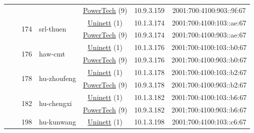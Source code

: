 \begin{small}
\begin{center}
\begin{longtable}{|c|c|c|c|c|c|c|c|}
  &  &  &  & \multicolumn{2}{|c|}{\tiny{\href{http://www.powertech.no}{PowerTech} (9)}} & \tiny{10.9.3.159} & \tiny{2001:700:4100:903::9f:67} \\* \cline{3-3}\cline{4-4}\cline{5-5}\cline{6-6}\cline{7-7}\cline{8-8}
  &  & \multirow{2}{*}{\tiny{174}} & \multicolumn{1}{|l|}{\multirow{2}{*}{\tiny{srl-thuen}}} & \multicolumn{2}{|c|}{\tiny{\href{https://www.uninett.no}{Uninett} (1)}} & \tiny{10.1.3.174} & \tiny{2001:700:4100:103::ae:67} \\* \cline{5-5}\cline{6-6}\cline{7-7}\cline{8-8}
  &  &  &  & \multicolumn{2}{|c|}{\tiny{\href{http://www.powertech.no}{PowerTech} (9)}} & \tiny{10.9.3.174} & \tiny{2001:700:4100:903::ae:67} \\* \cline{3-3}\cline{4-4}\cline{5-5}\cline{6-6}\cline{7-7}\cline{8-8}
  &  & \multirow{2}{*}{\tiny{176}} & \multicolumn{1}{|l|}{\multirow{2}{*}{\tiny{haw-cmt}}} & \multicolumn{2}{|c|}{\tiny{\href{https://www.uninett.no}{Uninett} (1)}} & \tiny{10.1.3.176} & \tiny{2001:700:4100:103::b0:67} \\* \cline{5-5}\cline{6-6}\cline{7-7}\cline{8-8}
  &  &  &  & \multicolumn{2}{|c|}{\tiny{\href{http://www.powertech.no}{PowerTech} (9)}} & \tiny{10.9.3.176} & \tiny{2001:700:4100:903::b0:67} \\* \cline{3-3}\cline{4-4}\cline{5-5}\cline{6-6}\cline{7-7}\cline{8-8}
  &  & \multirow{2}{*}{\tiny{178}} & \multicolumn{1}{|l|}{\multirow{2}{*}{\tiny{hu-zhoufeng}}} & \multicolumn{2}{|c|}{\tiny{\href{https://www.uninett.no}{Uninett} (1)}} & \tiny{10.1.3.178} & \tiny{2001:700:4100:103::b2:67} \\* \cline{5-5}\cline{6-6}\cline{7-7}\cline{8-8}
  &  &  &  & \multicolumn{2}{|c|}{\tiny{\href{http://www.powertech.no}{PowerTech} (9)}} & \tiny{10.9.3.178} & \tiny{2001:700:4100:903::b2:67} \\* \cline{3-3}\cline{4-4}\cline{5-5}\cline{6-6}\cline{7-7}\cline{8-8}
  &  & \multirow{2}{*}{\tiny{182}} & \multicolumn{1}{|l|}{\multirow{2}{*}{\tiny{hu-chengxi}}} & \multicolumn{2}{|c|}{\tiny{\href{https://www.uninett.no}{Uninett} (1)}} & \tiny{10.1.3.182} & \tiny{2001:700:4100:103::b6:67} \\* \cline{5-5}\cline{6-6}\cline{7-7}\cline{8-8}
  &  &  &  & \multicolumn{2}{|c|}{\tiny{\href{http://www.powertech.no}{PowerTech} (9)}} & \tiny{10.9.3.182} & \tiny{2001:700:4100:903::b6:67} \\* \cline{3-3}\cline{4-4}\cline{5-5}\cline{6-6}\cline{7-7}\cline{8-8}
  &  & \multirow{2}{*}{\tiny{198}} & \multicolumn{1}{|l|}{\multirow{2}{*}{\tiny{hu-kunwang}}} & \multicolumn{2}{|c|}{\tiny{\href{https://www.uninett.no}{Uninett} (1)}} & \tiny{10.1.3.198} & \tiny{2001:700:4100:103::c6:67} \\* \cline{5-5}\cline{6-6}\cline{7-7}\cline{8-8}

\end{longtable}
\end{center}
\end{small}
